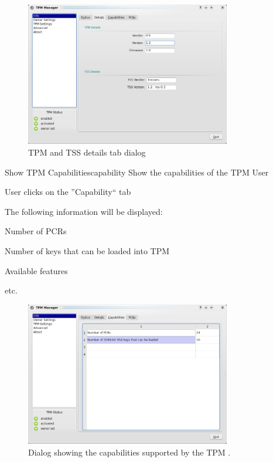 \documentclass[
  american        %
]{sirrixreport}
\begin{document}
\begin{figure}[h]
\centering
\includegraphics[width=0.8\textwidth]{images/uc20.jpg}
\caption{TPM and TSS details tab dialog } 
\end{figure}
\clearpage

\begin{usecase}{Show TPM Capabilities}{capability}
\ucdesc Show the capabilities of the TPM
\ucactors  User
\ucnormal 
 \item User clicks on the ''Capability`` tab
 \item The following information will be displayed:
   \begin{compactitem}
   \item Number of PCRs
   \item Number of keys that can be loaded into TPM
   \item Available features
   \item etc.
   \end{compactitem}
\ucendflow 
\end{usecase}

\begin{figure}[h]
\centering
\includegraphics[width=0.8\textwidth]{images/uc30.jpg}
\caption{Dialog showing the capabilities supported by the TPM .} 
\end{figure}
\clearpage
\end{document}
